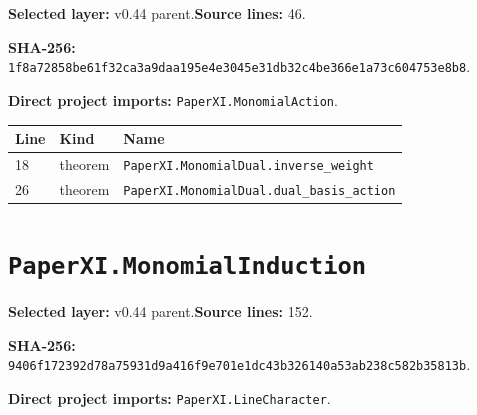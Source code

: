 \documentclass[10pt,oneside]{book}
\begin{document}
\textbf{Selected layer:} v0.44 parent.\quad\textbf{Source lines:} 46.\par\textbf{SHA-256:} {\scriptsize\nolinkurl{1f8a72858be61f32ca3a9daa195e4e3045e31db32c4be366e1a73c604753e8b8}}.


\textbf{Direct project imports:} \nolinkurl{PaperXI.MonomialAction}.

\begin{longtable}{@{}p{}p{}p{}@{}}\toprule Line&Kind&Name\\\midrule\endhead

18&theorem&\nolinkurl{PaperXI.MonomialDual.inverse_weight}\\

26&theorem&\nolinkurl{PaperXI.MonomialDual.dual_basis_action}\\

\bottomrule\end{longtable}

\section{\texorpdfstring{\nolinkurl{PaperXI.MonomialInduction}}{PaperXI.MonomialInduction}}\label{module:PaperXI.MonomialInduction}

\textbf{Selected layer:} v0.44 parent.\quad\textbf{Source lines:} 152.\par\textbf{SHA-256:} {\scriptsize\nolinkurl{9406f172392d78a75931d9a416f9e701e1dc43b326140a53ab238c582b35813b}}.


\textbf{Direct project imports:} \nolinkurl{PaperXI.LineCharacter}.
\end{document}
